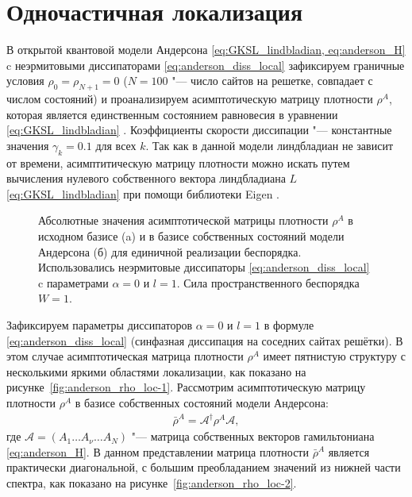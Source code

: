 \section{Одночастичная локализация}\label{sec:ch2/prl}

В открытой квантовой модели Андерсона \cref{eq:GKSL_lindbladian, eq:anderson_H} c неэрмитовыми диссипаторами \cref{eq:anderson_diss_local} зафиксируем граничные условия \(\rho_0 = \rho_{N+1} = 0\) (\(N = 100\) "--- число сайтов на решетке, совпадает с числом состояний) и проанализируем асимптотическую матрицу плотности \(\rho^A\), которая является единственным состоянием равновесия в уравнении \cref{eq:GKSL_lindbladian} \cite{book2007, Albert2014}. Коэффициенты скорости диссипации "--- константные значения \(\gamma_k = 0.1\) для всех \(k\).
Так как в данной модели линдбладиан не зависит от времени, асимптитическую матрицу плотности можно искать путем вычисления нулевого собственного вектора линдбладиана \(L\) \cref{eq:GKSL_lindbladian} при помощи библиотеки Eigen \cite{eigenweb}.

\begin{figure}[ht]
	\legend{}
	\caption[Асимптотическая матрица плотности с локализацией Андерсона]
	{
		Абсолютные значения асимптотической матрицы плотности \(\rho^A\) в исходном базисе (a) и в базисе собственных состояний модели Андерсона (б) для единичной реализации беспорядка. Использовались неэрмитовые диссипаторы \cref{eq:anderson_diss_local} c параметрами \(\alpha=0\) и \(l=1\). Сила пространственного беспорядка \(W=1\).
	}
	\label{fig:anderson_rho_loc}
\end{figure}

Зафиксируем параметры диссипаторов \(\alpha=0\) и \(l=1\) в формуле \cref{eq:anderson_diss_local} (синфазная диссипация на соседних сайтах решётки). В этом случае асимптотическая матрица плотности \(\rho^A\) имеет пятнистую структуру с несколькими яркими областями локализации, как показано на рисунке~\cref{fig:anderson_rho_loc-1}.
Рассмотрим асимптотическую матрицу плотности \(\rho^A\) в базисе собственных состояний модели Андерсона:
\begin{equation}
	\label{eq:anderson_rho_in_eigen_basis}
	\begin{gathered}
		\bar{\rho}^A = \mathcal{A}^\dagger \rho^A \mathcal{A},
	\end{gathered}
\end{equation}
где \(\mathcal{A} = \left(A_1 \ldots A_\nu \ldots A_N \right) \) "--- матрица собственных векторов гамильтониана \cref{eq:anderson_H}. В данном представлении матрица плотности \(\bar{\rho}^A\) является практически диагональной, с большим преобладанием значений из нижней части спектра, как показано на рисунке~\cref{fig:anderson_rho_loc-2}.

